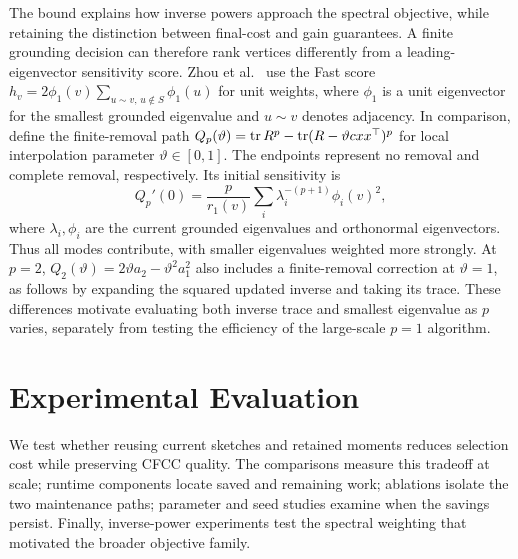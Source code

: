 The bound explains how inverse powers approach the spectral objective,
while retaining the distinction between final-cost and gain guarantees.
A finite grounding decision can therefore rank vertices differently
from a leading-eigenvector sensitivity score. Zhou et al.~\cite{zhou2023}
use the Fast score
$h_v=2\phi_1(v)\sum_{u\sim v,\,u\notin S}\phi_1(u)$ for unit
weights, where $\phi_1$ is a unit eigenvector for the smallest
grounded eigenvalue and $u\sim v$ denotes adjacency.
In comparison, define the finite-removal path
$Q_p(\vartheta)=\operatorname{tr} R^p-\operatorname{tr}(R-\vartheta cxx^\top)^p$ for local interpolation
parameter $\vartheta\in[0,1]$. The endpoints represent no removal and
complete removal, respectively. Its initial sensitivity is
\[
 Q_p'(0)=\frac p{r_1(v)}\sum_i\lambda_i^{-(p+1)}\phi_i(v)^2,
\]
where $\lambda_i,\phi_i$ are the current grounded eigenvalues and
orthonormal eigenvectors. Thus all modes contribute, with smaller
eigenvalues weighted more strongly. At $p=2$,
$Q_2(\vartheta)=2\vartheta a_2-\vartheta^2a_1^2$ also includes a finite-removal correction
at $\vartheta=1$, as follows by expanding the squared updated
inverse and taking its trace.
These differences motivate evaluating both inverse trace and smallest
eigenvalue as $p$ varies, separately from testing the efficiency of
the large-scale $p=1$ algorithm.

\section{Experimental Evaluation}\label{sec:experiments}
We test whether reusing current sketches and retained moments reduces
selection cost while preserving CFCC quality. The comparisons measure
this tradeoff at scale; runtime components locate saved and remaining
work; ablations isolate the two maintenance paths;
parameter and seed studies examine when the savings persist.
Finally, inverse-power experiments test the spectral weighting that
motivated the broader objective family.

